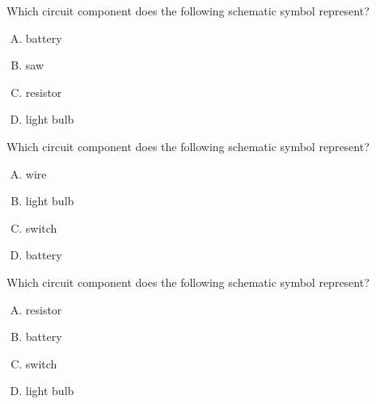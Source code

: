 \documentclass[14pt,t,dvipsnames]{beamer}
\begin{document}
\begin{frame}
Which circuit component does the following schematic symbol represent?

\begin{center}
\end{center}

\begin{enumerate}[A.]
    \item battery
    \item saw
    \item \alert<2->{resistor}
    \item light bulb
\end{enumerate}
\end{frame}

\begin{frame}
Which circuit component does the following schematic symbol represent?

\begin{center}
\end{center}

\begin{enumerate}[A.]
    \item wire
    \item light bulb
    \item switch
    \item \alert<2->{battery}
\end{enumerate}
\end{frame}

\begin{frame}
Which circuit component does the following schematic symbol represent?

\begin{center}
\end{center}

\begin{enumerate}[A.]
    \item resistor
    \item battery
    \item switch
    \item \alert<2->{light bulb}
\end{enumerate}
\end{frame}
\end{document}
